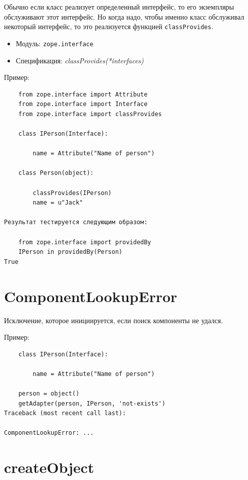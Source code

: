 \documentclass[a4paper,openany,twoside,draft]{book}
\providecommand*{\DUroletitlereference}[1]{\textsl{#1}}
\begin{document}
Обычно если класс реализует определенный интерфейс, то его экземпляры обслуживают этот интерфейс.  Но когда надо, чтобы именно класс обслуживал некоторый интерфейс, то это реализуется функцией \texttt{classProvides}.

\begin{itemize}

\item Модуль: \texttt{zope.interface}

\item Спецификация: \DUroletitlereference{classProvides(*interfaces)}

\end{itemize}

Пример:

\begin{verbatim}
    from zope.interface import Attribute
    from zope.interface import Interface
    from zope.interface import classProvides

    class IPerson(Interface):

        name = Attribute("Name of person")

    class Person(object):

        classProvides(IPerson)
        name = u"Jack"

Результат тестируется следующим образом:

    from zope.interface import providedBy
    IPerson in providedBy(Person)
True
\end{verbatim}


\section*{ComponentLookupError%
  \label{componentlookuperror}%
}

Исключение, которое инициируется, если поиск компоненты не удался.

Пример:

\begin{verbatim}
    class IPerson(Interface):

        name = Attribute("Name of person")

    person = object()
    getAdapter(person, IPerson, 'not-exists')
Traceback (most recent call last):

ComponentLookupError: ...
\end{verbatim}


\section*{createObject%
  \label{createobject}%
}
\end{document}
